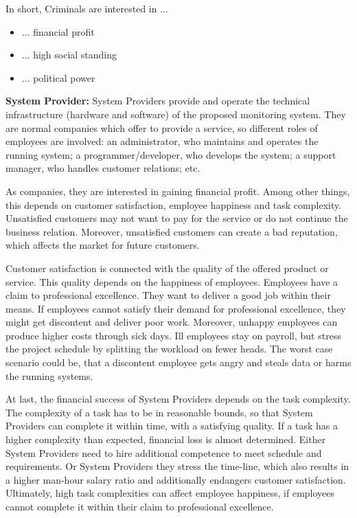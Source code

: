 In short, Criminals are interested in ...
\begin{itemize}
\item ... financial profit
\item ... high social standing
\item ... political power
\end{itemize}

\textbf{System Provider:}
System Providers provide and operate the technical infrastructure (hardware and software) of the proposed monitoring system.
They are normal companies which offer to provide a service, so different roles of employees are involved:
 an administrator, who maintains and operates the running system;
 a programmer/developer, who develops the system;
 a support manager, who handles customer relations;
 etc.

As companies, they are interested in gaining financial profit.
Among other things, this depends on customer satisfaction, employee happiness and task complexity.
Unsatisfied customers may not want to pay for the service or do not continue the business relation.
Moreover, unsatisfied customers can create a bad reputation, which affects the market for future customers.

Customer satisfaction is connected with the quality of the offered product or service.
This quality depends on the happiness of employees. 
Employees have a claim to professional excellence.
They want to deliver a good job within their means.
If employees cannot satisfy their demand for professional excellence, they might get discontent and deliver poor work.
Moreover, unhappy employees can produce higher costs through sick days.
Ill employees stay on payroll, but stress the project schedule by splitting the workload on fewer heads.
The worst case scenario could be, that a discontent employee gets angry and steals data or harms the running systems.

At last, the financial success of System Providers depends on the task complexity.
The complexity of a task has to be in reasonable bounds, so that System Providers can complete it within time, with a satisfying quality.
If a task has a higher complexity than expected, financial loss is almost determined.
Either System Providers need to hire additional competence to meet schedule and requirements.
Or System Providers they stress the time-line, which also results in a higher man-hour salary ratio and additionally endangers customer satisfaction.
Ultimately, high task complexities can affect employee happiness, if employees cannot complete it within their claim to professional excellence.  

